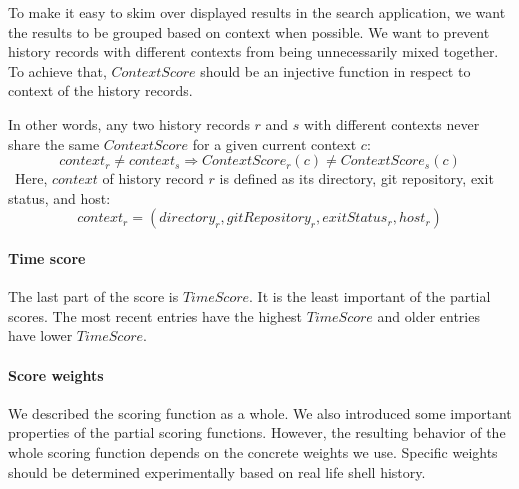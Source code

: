 \documentclass[thesis=M,english]{FITthesis}[2012/10/20]
\begin{document}
To make it easy to skim over displayed results in the search application, we want the results to be grouped based on context when possible. 
We want to prevent history records with different contexts from being unnecessarily mixed together. 
To achieve that, \(ContextScore\) should be an injective function in respect to context of the history records.

In other words, any two history records \(r\) and \(s\) with different contexts never share the same \(ContextScore\) for a given current context \(c\):
\[ context_{r} \neq context_{s}  \Rightarrow ContextScore_r(c) \neq ContextScore_s(c) \]\
Here, \(context\) of history record \(r\) is defined as its directory, git repository, exit status, and host:
\[ context_r = (directory_r, gitRepository_r, exitStatus_r, host_r) \]



\paragraph{Time score}

The last part of the score is \(TimeScore\). It is the least important of the partial scores. The most recent entries have the highest \(TimeScore\) and older entries have lower \(TimeScore\). 



\paragraph{Score weights}

We described the scoring function as a whole. We also introduced some important properties of the partial scoring functions. However, the resulting behavior of the whole scoring function depends on the concrete weights we use. 
Specific weights should be determined experimentally based on real life shell history.




\end{document}
